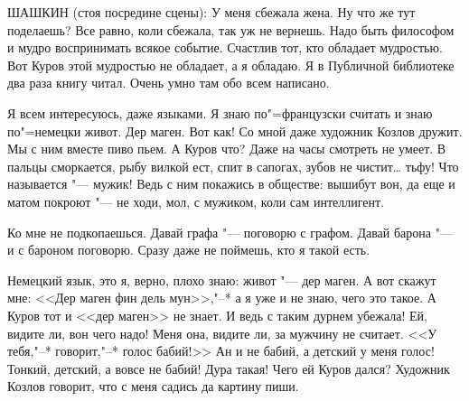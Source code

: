 ШАШКИН (стоя посредине сцены): У меня сбежала жена. Ну что же тут поделаешь? Все равно, коли сбежала, так уж не вернешь. Надо быть философом и мудро воспринимать всякое событие. Счастлив тот, кто обладает мудростью. Вот Куров этой мудростью не обладает, а я обладаю. Я в Публичной библиотеке два раза книгу читал. Очень умно там обо всем написано.

Я всем интересуюсь, даже языками. Я знаю по"=французски считать и знаю по"=немецки живот. Дер маген. Вот как! Со мной даже художник Козлов дружит. Мы с ним вместе пиво пьем. А Куров что? Даже на часы смотреть не умеет. В пальцы сморкается, рыбу вилкой ест, спит в сапогах, зубов не чистит\dots{} тьфу! Что называется "--- мужик! Ведь с ним покажись в обществе: вышибут вон, да еще и матом покроют "--- не ходи, мол, с мужиком, коли сам интеллигент.

Ко мне не подкопаешься. Давай графа "--- поговорю с графом. Давай барона "--- и с бароном поговорю. Сразу даже не поймешь, кто я такой есть.

Немецкий язык, это я, верно, плохо знаю: живот "--- дер маген. А вот скажут мне: <<Дер маген фин дель мун>>,"--* а я уже и не знаю, чего это такое. А Куров тот и <<дер маген>> не знает. И ведь с таким дурнем убежала! Ей, видите ли, вон чего надо! Меня она, видите ли, за мужчину не считает. <<У тебя,"--* говорит,"--* голос бабий!>> Ан и не бабий, а детский у меня голос! Тонкий, детский, а вовсе не бабий! Дура такая! Чего ей Куров дался? Художник Козлов говорит, что с меня садись да картину пиши.
